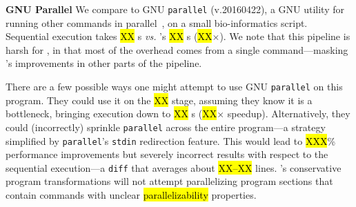 \documentclass[letterpaper,twocolumn,10pt]{article}
\newcommand{\vs}{{\em vs.} }
\newcommand{\heading}[1]{\vspace{4pt}\noindent\textbf{#1}\enspace}
\newcommand{\ttt}[1]{\texttt{#1}}
\newcommand{\todo}[1]{\hl{#1}\xspace}
\newcommand{\kk}[1]{[{\color{magenta}kk: #1}]}
\begin{document}

\heading{GNU Parallel}
We compare \sys to GNU \ttt{parallel} (v.20160422), a GNU utility for running other commands in parallel~\cite{Tange2011a}, on a small bio-informatics script.
Sequential execution takes \todo{XX}s \vs \sys's \todo{XX}s (\todo{XX}$\times$).
We note that this pipeline is harsh for \sys, in that most of the overhead comes from a single command---masking \sys's improvements in other parts of the pipeline.


There are a few possible ways one might attempt to use GNU \ttt{parallel} on this program.
They could use it on the \todo{XX} stage, assuming they know it is a bottleneck, bringing execution down to \todo{XX}s (\todo{XX}$\times$ speedup).
Alternatively, they could (incorrectly) sprinkle \ttt{parallel} across the entire program---a strategy simplified by \ttt{parallel}'s \ttt{stdin} redirection feature.
This would lead to \todo{XXX}\% performance improvements but severely incorrect results with respect to the sequential execution---a \ttt{diff} that averages about \todo{XX--XX} lines.
\sys's conservative program transformations will not attempt parallelizing program sections that contain commands with unclear \todo{parallelizability} properties.


\end{document}
